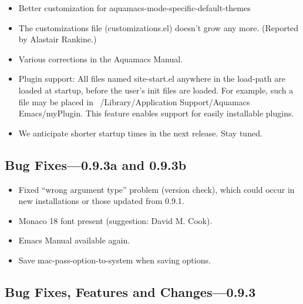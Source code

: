 \begin{itemize}
\item Better customization for aquamacs-mode-specific-default-themes

\item The customizations file (customizations.el) doesn't grow any more.
    (Reported by Alastair Rankine.)

\item Various corrections in the Aquamacs Manual.

\item Plugin support: All files named site-start.el anywhere in the load-path
    are loaded at startup, before the user's init files are
    loaded. For example, such a file may be placed in
    ~/Library/Application Support/Aquamacs Emacs/myPlugin. This
    feature enables support for easily installable plugins.

\item We anticipate shorter startup times in the next release. Stay tuned.
\end{itemize}


\subsection{Bug Fixes---0.9.3a and 0.9.3b}

\begin{itemize}

\item Fixed ``wrong argument type'' problem (version check),
    which could occur in new installations or those updated from 0.9.1.

\item Monaco 18 font present (suggestion: David M. Cook).

\item Emacs Manual available again.

\item Save mac-pass-option-to-system when saving options.
\end {itemize}


\subsection{Bug Fixes, Features and Changes---0.9.3}

